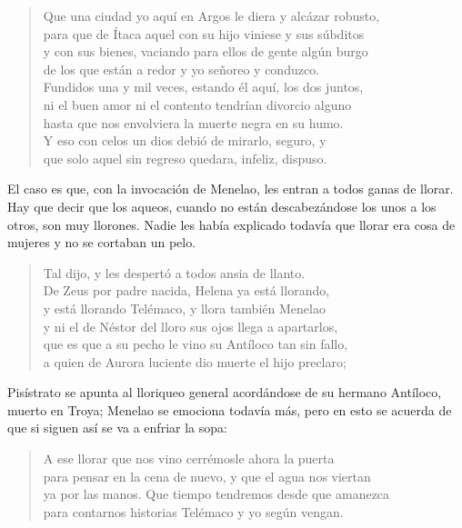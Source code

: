 \documentclass[11pt,a4paper]{article}
\begin{document}
\begin{verse}
Que una ciudad yo aquí en Argos le diera y alcázar robusto,\\
para que de Ítaca aquel con su hijo viniese y sus súbditos\\
y con sus bienes, vaciando para ellos de gente algún burgo\\
de los que están a redor y yo señoreo y conduzco.\\
Fundidos una y mil veces, estando él aquí, los dos juntos,\\
ni el buen amor ni el contento tendrían divorcio alguno\\
hasta que nos envolviera la muerte negra en su humo.\\
Y eso con celos un dios debió de mirarlo, seguro, y\\
que solo aquel sin regreso quedara, infeliz, dispuso.
\end{verse}

El caso es que, con la invocación de Menelao, les entran a todos ganas de llorar.
Hay que decir que los aqueos, cuando no están descabezándose los unos a los otros, son muy llorones. Nadie les había explicado todavía que llorar era cosa de mujeres y no se cortaban un pelo.

\begin{verse}
Tal dijo, y les despertó a todos ansia de llanto.\\
De Zeus por padre nacida, Helena ya está llorando,\\
y está llorando Telémaco, y llora también Menelao\\
y ni el de Néstor del lloro sus ojos llega a apartarlos,\\
que es que a su pecho le vino su Antíloco tan sin fallo,\\
a quien de Aurora luciente dio muerte el hijo preclaro;
\end{verse}

Pisístrato se apunta al lloriqueo general acordándose de su hermano Antíloco, muerto en Troya; Menelao se emociona todavía más, pero en esto se acuerda de que si siguen así se va a enfriar la sopa:

\begin{verse}
A ese llorar que nos vino cerrémosle ahora la puerta\\
para pensar en la cena de nuevo, y que el agua nos viertan\\
ya por las manos. Que tiempo tendremos desde que amanezca\\
para contarnos historias Telémaco y yo según vengan.
\end{verse}
\end{document}
